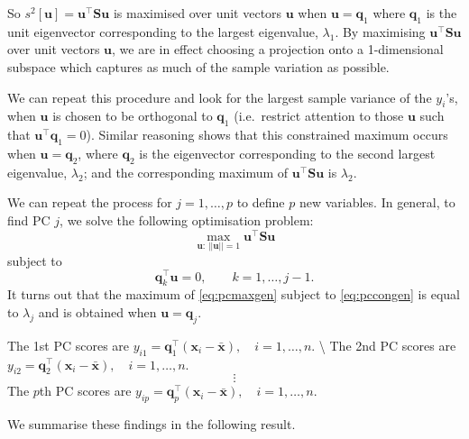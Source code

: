 \documentclass[]{book}
\theoremstyle{definition}
\theoremstyle{definition}
\theoremstyle{definition}
\theoremstyle{remark}
\begin{document}
So \(s^2[\boldsymbol u] = \boldsymbol u^\top \boldsymbol S\boldsymbol u\) is maximised over unit vectors \(\boldsymbol u\) when \(\boldsymbol u= \boldsymbol q_1\) where \(\boldsymbol q_1\) is the unit eigenvector corresponding to the largest eigenvalue, \(\lambda_1\). By maximising \(\boldsymbol u^\top \boldsymbol S\boldsymbol u\) over unit vectors \(\boldsymbol u\), we are in effect choosing a projection onto a 1-dimensional subspace which captures as much of the sample variation as possible.

We can repeat this procedure and look for the largest sample variance of the \(y_i\)'s, when
\(\boldsymbol u\) is chosen to be orthogonal to \(\boldsymbol q_1\) (i.e.~restrict attention to those \(\boldsymbol u\) such that \(\boldsymbol u^\top \boldsymbol q_1 = 0\)). Similar reasoning shows that this constrained maximum occurs when \(\boldsymbol u= \boldsymbol q_2\), where \(\boldsymbol q_2\) is
the eigenvector corresponding to the second largest eigenvalue, \(\lambda_2\); and the corresponding maximum of \(\boldsymbol u^\top \boldsymbol S\boldsymbol u\) is \(\lambda_2\).

We can repeat the process for \(j=1,\ldots,p\) to define \(p\) new variables. In general, to find PC \(j\), we solve the following optimisation problem:
\begin{equation}
\max_{\boldsymbol u: \, \vert \vert \boldsymbol u\vert \vert =1}\boldsymbol u^\top \boldsymbol S\boldsymbol u
\label{eq:pcmaxgen}
\end{equation}
subject to
\begin{equation}
\boldsymbol q_k^\top \boldsymbol u=0, \qquad k=1, \ldots , j-1.
\label{eq:pccongen}
\end{equation}
It turns out that the maximum of \eqref{eq:pcmaxgen}
subject to \eqref{eq:pccongen} is equal to \(\lambda_j\) and is obtained when \(\boldsymbol u=\boldsymbol q_j\).

The 1st PC scores are \(y_{i1} = \boldsymbol q_1^\top (\boldsymbol x_i - \bar{\boldsymbol x}), \quad i=1,\ldots,n\). \textbackslash{}
The 2nd PC scores are \(y_{i2} = \boldsymbol q_2^\top (\boldsymbol x_i - \bar{\boldsymbol x}), \quad i=1,\ldots,n\).
\[ \vdots \]
The \(p\)th PC scores are \(y_{ip} = \boldsymbol q_p^\top (\boldsymbol x_i - \bar{\boldsymbol x}), \quad i=1,\ldots,n\).

We summarise these findings in the following result.
\end{document}
